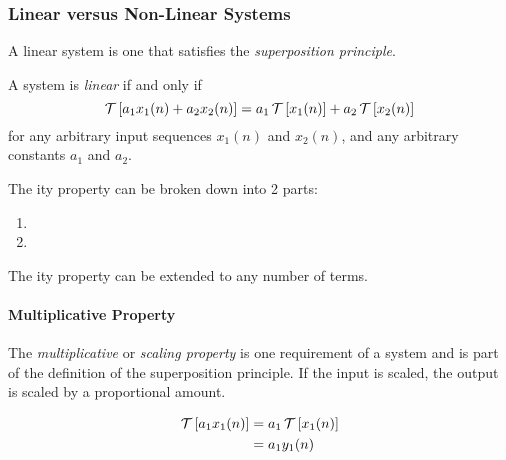 \subsubsection{Linear versus Non-Linear Systems}\label{subsubsec:Linear_vs_Non-Linear_Systems}
A linear system is one that satisfies the \textit{superposition principle}.
\begin{definition}[Linear]\label{def:Linear}
  A system is \emph{linear} if and only if
  \begin{equation}\label{eq:Linear}
    \operatorname{\mathcal{T}} \left[ a_{1}x_{1}(n) + a_{2}x_{2}(n) \right] = a_{1}\operatorname{\mathcal{T}} \left[ x_{1}(n) \right] + a_{2} \operatorname{\mathcal{T}} \left[ x_{2}(n) \right]
  \end{equation}
  for any arbitrary input sequences $x_{1}(n)$ and $x_{2}(n)$, and any arbitrary constants $a_{1}$ and $a_{2}$.

  The ity property can be broken down into 2 parts:
  \begin{enumerate}[noitemsep]
  \item {}
  \item {}
  \end{enumerate}

  \begin{remark}
    The ity property can be extended to any number of terms.
  \end{remark}
\end{definition}

\paragraph{Multiplicative Property}\label{par:Linear-Multiplicative_Property}
\begin{definition}\label{def:Linear-Multiplicative_Property}
  The \emph{multiplicative} or \emph{scaling property} is one requirement of a  system and is part of the definition of the superposition principle.
  If the input is scaled, the output is scaled by a proportional amount.
  
  \begin{equation}\label{eq:Linear-Multiplicative_Property}
    \begin{aligned}
      \operatorname{\mathcal{T}} \left[ a_{1}x_{1}(n) \right] &= a_{1} \operatorname{\mathcal{T}} \left[ x_{1}(n) \right] \\
      &= a_{1}y_{1}(n) \\
    \end{aligned}
  \end{equation}
\end{definition}

